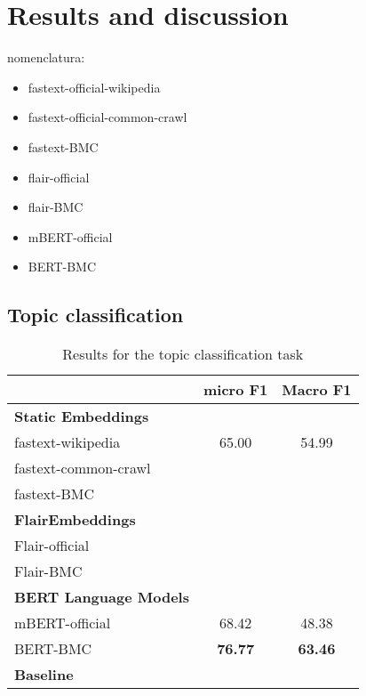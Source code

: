 \documentclass[10pt, a4paper]{article}
\begin{document}

\section{Results and discussion}\label{sec:results-discussion}

nomenclatura: \begin{itemize}
    \item fastext-official-wikipedia
    \item fastext-official-common-crawl
    \item fastext-BMC
    \item flair-official
    \item flair-BMC
    \item mBERT-official
    \item BERT-BMC
\end{itemize}



\subsection{Topic classification}\label{sec:topic}

\begin{table}[!t]\scriptsize
\centering
\begin{tabular}{@{\hspace{0.3cm}}lcc} \hline
 {\textbf{}} & {\textbf{micro F1}} &  {\textbf{Macro F1}} \\ \hline
\textbf{Static Embeddings} & & \\
fastext-wikipedia & 65.00 &	54.99 \\
fastext-common-crawl &  &   \\
fastext-BMC  &  &	 \\
\hline%
\textbf{FlairEmbeddings}\\
Flair-official &  &	 \\
Flair-BMC  & 	&  \\
\textbf{BERT Language Models}\\
mBERT-official  & 68.42 & 48.38  \\
BERT-BMC  & \textbf{76.77}	& \textbf{63.46}  \\
\hline 
\textbf{Baseline} \\

\end{tabular}
\caption{Results for the topic classification task}\label{tab:topic}
\end{table}
\end{document}
